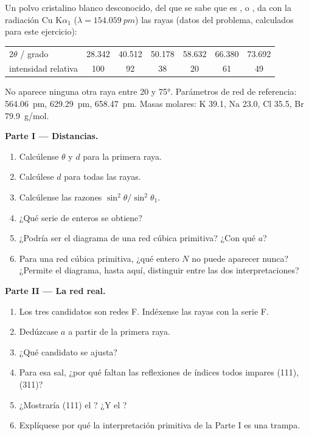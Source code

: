 \begin{problem}
\label{pb:b3:x-ray-diffraction:1}
Un polvo cristalino blanco desconocido, del que se sabe que es ,  o ,
da con la radiación Cu K$\alpha_1$ ($\lambda = \qty{154.059}{pm}$) las rayas (datos del
problema, calculados para este ejercicio):
\begin{center}\small
\begin{tabular}{lcccccc}
\hline
$2\theta$ / grado & 28.342 & 40.512 & 50.178 & 58.632 & 66.380 & 73.692 \\
intensidad relativa & 100 & 92 & 38 & 20 & 61 & 49 \\ \hline
\end{tabular}
\end{center}
No aparece ninguna otra raya entre 20 y \ang{75}. Parámetros de red de referencia:
 \qty{564.06}{pm},  \qty{629.29}{pm},  \qty{658.47}{pm}. Masas molares:
K 39.1, Na 23.0, Cl 35.5, Br \qty{79.9}{g/mol}.

\medskip\noindent\textbf{Parte I --- Distancias.}
\begin{enumerate}
  \item Calcúlense $\theta$ y $d$ para la primera raya.
  \item Calcúlese $d$ para todas las rayas.
  \item Calcúlense las razones $\sin^2\theta/\sin^2\theta_1$.
  \item ¿Qué serie de enteros se obtiene?
  \item ¿Podría ser el diagrama de una red cúbica primitiva? ¿Con qué $a$?
  \item Para una red cúbica primitiva, ¿qué entero $N$ no puede aparecer nunca? ¿Permite
        el diagrama, hasta aquí, distinguir entre las dos interpretaciones?
\end{enumerate}

\medskip\noindent\textbf{Parte II --- La red real.}
\begin{enumerate}[resume]
  \item Los tres candidatos son redes F. Indéxense las rayas con la serie F.
  \item Dedúzcase $a$ a partir de la primera raya.
  \item ¿Qué candidato se ajusta?
  \item Para esa sal, ¿por qué faltan las reflexiones de índices todos impares (111), (311)?
  \item ¿Mostraría (111) el ? ¿Y el ?
  \item Explíquese por qué la interpretación primitiva de la Parte I es una trampa.
\end{enumerate}


\end{problem}
